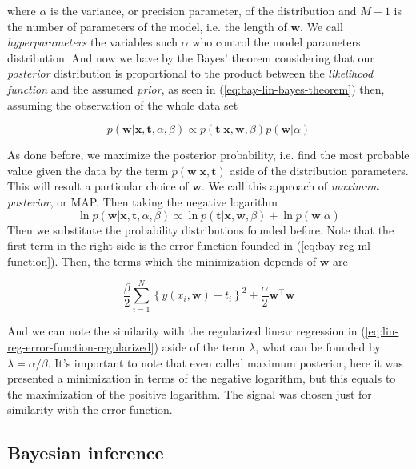\documentclass[11pt]{article} %
\begin{document}
where $\alpha$ is the variance, or precision parameter, of the distribution and $M+1$ is the number of parameters of the model, i.e. the length of $\mathbf{w}$. We call \textit{hyperparameters} the variables such $\alpha$ who control the model parameters distribution. And now we have by the Bayes' theorem considering that our \textit{posterior} distribution is proportional to the product between the \textit{likelihood function} and the assumed \textit{prior}, as seen in (\ref{eq:bay-lin-bayes-theorem}) then, assuming the observation of the whole data set

\begin{equation}
   p(\mathbf{w} | \mathbf{x}, \mathbf{t}, \alpha, \beta) \propto p(\mathbf{t} | \mathbf{x}, \mathbf{w}, \beta) p(\mathbf{w} | \alpha)
\end{equation}

As done before, we maximize the posterior probability, i.e. find the most probable value given the data by the term $p(\mathbf{w} | \mathbf{x}, \mathbf{t}) $ aside of the distribution parameters. This will result a particular choice of $\mathbf{w}$. We call this approach of \textit{maximum posterior}, or MAP. Then taking the negative logarithm
%
\begin{equation}
   \ln p(\mathbf{w} | \mathbf{x}, \mathbf{t}, \alpha, \beta) \propto \ln p(\mathbf{t} | \mathbf{x}, \mathbf{w}, \beta) + \ln p(\mathbf{w} | \alpha)
\end{equation}
%
Then we substitute the probability distributions founded before. Note that the first term in the right side is the error function founded in (\ref{eq:bay-reg-ml-function}). Then, the terms which the minimization depends of $\mathbf{w}$ are

\begin{equation}
    \frac{\beta}{2} \sum_{i=1}^{N}\left\{y\left(x_{i}, \mathbf{w}\right)-t_{i}\right\}^{2} + \frac{\alpha}{2} \mathbf{w}^\top \mathbf{w}
\end{equation}

And we can note the similarity with the regularized linear regression in (\ref{eq:lin-reg-error-function-regularized}) aside of the term $\lambda$, what can be founded by $\lambda=\alpha / \beta$. It's important to note that even called maximum posterior, here it was presented a minimization in terms of the negative logarithm, but this equals to the maximization of the positive logarithm. The signal was chosen just for similarity with the error function.

\subsection{Bayesian inference}
\end{document}
